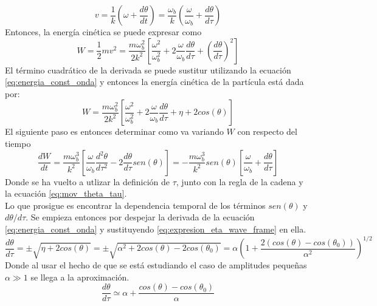 \documentclass[../tesis_main_file.tex]{subfiles}
\begin{document}
\begin{equation}
\label{eq:velocidad_lab_transferencia}
v =\frac{1}{k}\left(\omega +\frac{d\theta}{dt}\right)= \frac{\omega_b}{k}\left(\frac{\omega}{\omega_b} +\frac{d\theta}{d\tau}\right)
\end{equation}
Entonces, la energía cinética se puede expresar como
\begin{equation}
\label{eq:energia_cintetica_1}
W = \frac{1}{2}mv^2=\frac{m\omega_b^2}{2k^2}\left[\frac{\omega^2}{\omega_b^2}+2\frac{\omega}{\omega_b}\frac{d\theta}{d\tau}+\left(\frac{d\theta}{d\tau}\right)^2\right]
\end{equation}
El término cuadrático de la derivada se puede sustitur utilizando la ecuación \ref{eq:energia_const_onda} y entonces la energía cinética de la partícula está dada por:
\begin{equation}
\label{eq:energia_cinetica_2}
W = \frac{m\omega_b^2}{2k^2}\left[\frac{\omega^2}{\omega_b^2}+2\frac{\omega}{\omega_b}\frac{d\theta}{d\tau}+\eta+ 2cos(\theta)\right]
\end{equation}
El siguiente paso es entonces determinar como va variando $W$ con respecto del tiempo
\begin{equation}
\label{eq:derivada_temp_W_1}
\frac{dW}{dt}=\frac{m\omega_b^3}{k^2}\left[\frac{\omega}{\omega_b}\frac{d^2\theta}{d\tau^2}-2\frac{d\theta}{d\tau}sen(\theta)\right]=-\frac{m\omega_b^3}{k^2}sen(\theta)\left[\frac{\omega}{\omega_b}+\frac{d\theta}{d\tau}\right]
\end{equation}
Donde se ha vuelto a utlizar la definición de $\tau$, junto con la regla de la cadena y la ecuación \ref{eq:mov_theta_tau}.\\
Lo que prosigue es encontrar la dependencia temporal de los términos $sen(\theta)$ y $d\theta /d\tau$. Se empieza entonces por despejar la derivada de la ecuación \ref{eq:energia_const_onda} y sustituyendo \ref{eq:expresion_eta_wave_frame} en ella.
\begin{equation}
\label{eq:despeje_deriv_theta_tau}
\frac{d\theta}{d\tau}=\pm \sqrt{\eta + 2cos(\theta)}=\pm \sqrt{\alpha^2+2cos(\theta)-2cos(\theta_0)}=\alpha \left(1 + \frac{2(cos(\theta)-cos(\theta_0))}{\alpha^2}\right)^{1/2}
\end{equation}
Donde al usar el hecho de que se está estudiando el caso de amplitudes pequeñas $\alpha \gg 1$ se llega a la aproximación.
\begin{equation}
\label{eq:aproximation_deriv_theta_tau}
\frac{d\theta}{d\tau}\simeq \alpha + \frac{cos(\theta)-cos(\theta_0)}{\alpha}
\end{equation}
\end{document}
